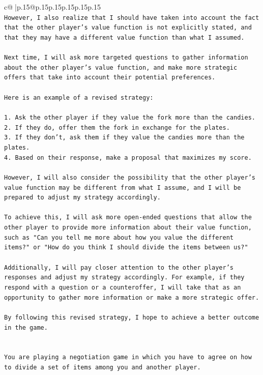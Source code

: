 \documentclass{article}
\begin{document}
{\begin{supertabular}{c@{$\;$}|p{.15\linewidth}@{}p{.15\linewidth}p{.15\linewidth}p{.15\linewidth}p{.15\linewidth}p{.15\linewidth}}
{{{\\ 
\texttt{However, I also realize that I should have taken into account the fact that the other player's value function is not explicitly stated, and that they may have a different value function than what I assumed. } \\
\\ 
\texttt{Next time, I will ask more targeted questions to gather information about the other player's value function, and make more strategic offers that take into account their potential preferences. } \\
\\ 
\texttt{Here is an example of a revised strategy:} \\
\\ 
\texttt{1. Ask the other player if they value the fork more than the candies.} \\
\texttt{2. If they do, offer them the fork in exchange for the plates.} \\
\texttt{3. If they don't, ask them if they value the candies more than the plates.} \\
\texttt{4. Based on their response, make a proposal that maximizes my score.} \\
\\ 
\texttt{However, I will also consider the possibility that the other player's value function may be different from what I assume, and I will be prepared to adjust my strategy accordingly.} \\
\\ 
\texttt{To achieve this, I will ask more open{-}ended questions that allow the other player to provide more information about their value function, such as "Can you tell me more about how you value the different items?" or "How do you think I should divide the items between us?"} \\
\\ 
\texttt{Additionally, I will pay closer attention to the other player's responses and adjust my strategy accordingly. For example, if they respond with a question or a counteroffer, I will take that as an opportunity to gather more information or make a more strategic offer.} \\
\\ 
\texttt{By following this revised strategy, I hope to achieve a better outcome in the game.} \\
\\ 
\\ 
\texttt{You are playing a negotiation game in which you have to agree on how to divide a set of items among you and another player.} \\
}}}
\end{supertabular}}
\end{document}
